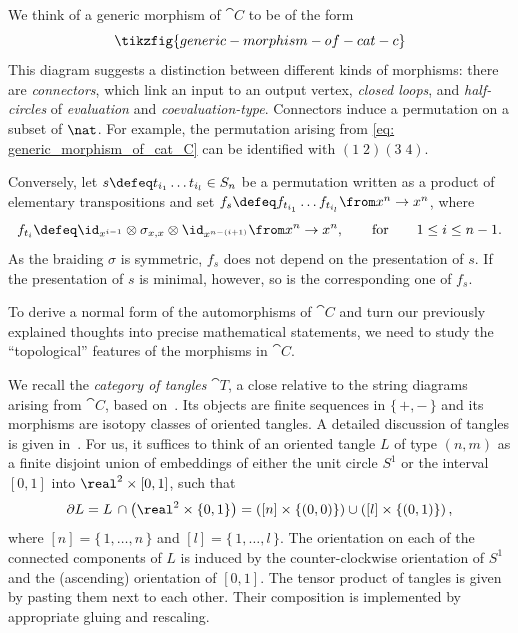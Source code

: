 We think of a generic morphism of \(\cat{C}\) to be of the form
\begin{equation}\label{eq: generic_morphism_of_cat_C}
  \tikzfig{generic-morphism-of-cat-c}
\end{equation}
This diagram suggests a distinction between different kinds of morphisms:
there are \emph{connectors}, which link an input to an output vertex,
\emph{closed loops},
and \emph{half-circles} of \emph{evaluation} and \emph{coevaluation-type}.
Connectors induce a permutation on a subset of \(\nat\).
For example, the permutation arising from \cref{eq: generic_morphism_of_cat_C}
can be identified with \((1 \; 2)(3 \; 4)\).

Conversely, let \(s \defeq t_{i_1} \dots t_{i_l}\in S_{n}\)
be a permutation written as a product of elementary transpositions and set \(f_s \defeq f_{t_{i_1}}\dots f_{t_{i_l}} \from x^n \to x^n\),
where
\[
  f_{t_i} \defeq \id_{x^{i-1}} \otimes \sigma_{x,x}\otimes \id_{x^{n-(i+1)}}\from x^n \to x^n, \qquad \text{for} \qquad  1\leq i \leq n-1.
\]
As the braiding \(\sigma\) is symmetric, \(f_s\) does not depend on the presentation of \(s\).
If the presentation of \(s\) is minimal, however, so is the corresponding one of \(f_s\).

To derive a normal form of the automorphisms of \(\cat{C}\) and turn our previously explained thoughts into precise mathematical statements,
we need to study the ``topological'' features of the morphisms in \(\cat{C}\).

\begin{remark}\label{rem: category_of_tangles}
  We recall the \emph{category of tangles} \(\cat{T}\),
  a close relative to the string diagrams arising from \(\cat{C}\),
  based on~\cite[Chapter~\textsc{xii}.2]{Kassel1998}.
  Its objects are finite sequences in \(\{\, {+}, {-}\,\}\) and its morphisms are isotopy classes of oriented tangles.
  A detailed discussion of tangles is given in~\cite[Definition~\textsc{x}.5.1]{Kassel1998}.
  For us, it suffices to think of an oriented tangle \(L\) of type \((n,m)\) as
  a finite disjoint union of embeddings of either the unit circle \(S^1\) or the interval \([0,1]\)
  into \(\real^2 \times [0,1]\), such that
  \[
    \partial L = L \, \cap \left( \real^2 \times \{0,1\} \right) = \left([n] \times \left\{(0,0)\right\}\right) \cup \left([l]\times \left\{(0,1)\right\}\right),
  \]
  where \([n] = \{\, 1, \dots, n \,\}\) and \([l] = \{\, 1, \dots, l \,\}\).
  The orientation on each of the connected components of \(L\)
  is induced by the counter-clockwise orientation of \(S^1\) and the (ascending) orientation of \([0,1]\).
  The tensor product of tangles is given by pasting them next to each other.
  Their composition is implemented by appropriate gluing and rescaling.
\end{remark}

